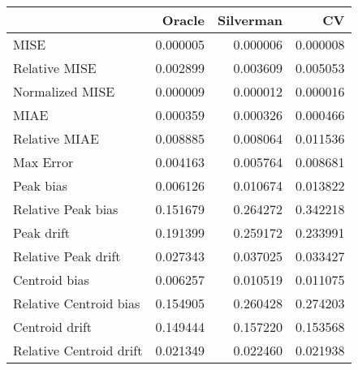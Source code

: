 \begin{tabular}{lrrr}
  \hline
 & Oracle & Silverman & CV \\ 
  \hline
MISE & 0.000005 & 0.000006 & 0.000008 \\ 
  Relative MISE & 0.002899 & 0.003609 & 0.005053 \\ 
  Normalized MISE & 0.000009 & 0.000012 & 0.000016 \\ 
  MIAE & 0.000359 & 0.000326 & 0.000466 \\ 
  Relative MIAE & 0.008885 & 0.008064 & 0.011536 \\ 
  Max Error & 0.004163 & 0.005764 & 0.008681 \\ 
  Peak bias & 0.006126 & 0.010674 & 0.013822 \\ 
  Relative Peak bias & 0.151679 & 0.264272 & 0.342218 \\ 
  Peak drift & 0.191399 & 0.259172 & 0.233991 \\ 
  Relative Peak drift & 0.027343 & 0.037025 & 0.033427 \\ 
  Centroid bias & 0.006257 & 0.010519 & 0.011075 \\ 
  Relative Centroid bias & 0.154905 & 0.260428 & 0.274203 \\ 
  Centroid drift & 0.149444 & 0.157220 & 0.153568 \\ 
  Relative Centroid drift & 0.021349 & 0.022460 & 0.021938 \\ 
   \hline
\end{tabular}
